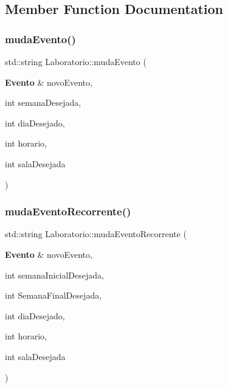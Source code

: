 \subsection{Member Function Documentation}
\mbox{\label{class_laboratorio_aaa169c8ab133110fd015ff919da98a0b}} 
\subsubsection{muda\+Evento()}
{\footnotesize\ttfamily std\+::string Laboratorio\+::muda\+Evento (\begin{DoxyParamCaption}\item[{\textbf{ Evento} \&}]{novo\+Evento,  }\item[{int}]{semana\+Desejada,  }\item[{int}]{dia\+Desejado,  }\item[{int}]{horario,  }\item[{int}]{sala\+Desejada }\end{DoxyParamCaption})\hspace{0.3cm}{\ttfamily [inline]}}

\mbox{\label{class_laboratorio_abddabb6648718f06ace7ef6743974687}} 
\subsubsection{muda\+Evento\+Recorrente()}
{\footnotesize\ttfamily std\+::string Laboratorio\+::muda\+Evento\+Recorrente (\begin{DoxyParamCaption}\item[{\textbf{ Evento} \&}]{novo\+Evento,  }\item[{int}]{semana\+Inicial\+Desejada,  }\item[{int}]{Semana\+Final\+Desejada,  }\item[{int}]{dia\+Desejado,  }\item[{int}]{horario,  }\item[{int}]{sala\+Desejada }\end{DoxyParamCaption})\hspace{0.3cm}{\ttfamily [inline]}}

\mbox{\label{class_laboratorio_af5e56fbf8fb88cae245ba4f6c2800a38}} 

